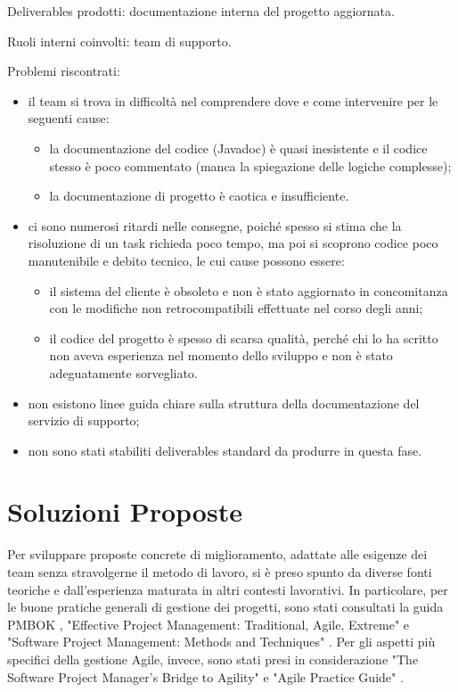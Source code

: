     Deliverables prodotti: documentazione interna del progetto aggiornata.

    Ruoli interni coinvolti: team di supporto.

    Problemi riscontrati:
    \begin{itemize}
        \item il team si trova in difficoltà nel comprendere dove e come intervenire per le seguenti cause:
            \begin{itemize}
                \item la documentazione del codice (Javadoc) è quasi inesistente e il codice stesso è poco commentato (manca la spiegazione delle logiche complesse);
                \item la documentazione di progetto è caotica e insufficiente.
            \end{itemize}
        \item ci sono numerosi ritardi nelle consegne, poiché spesso si stima che la risoluzione di un task richieda poco tempo,
        ma poi si scoprono codice poco manutenibile e debito tecnico, le cui cause possono essere:
            \begin{itemize}
                \item il sistema del cliente è obsoleto e non è stato aggiornato in concomitanza con le modifiche non retrocompatibili effettuate nel corso degli anni;
                \item il codice del progetto è spesso di scarsa qualità, perché chi lo ha scritto non aveva esperienza nel momento dello sviluppo e non è stato adeguatamente sorvegliato.
            \end{itemize}
        \item non esistono linee guida chiare sulla struttura della documentazione del servizio di supporto;
        \item non sono stati stabiliti deliverables standard da produrre in questa fase.
    \end{itemize}

\section{Soluzioni Proposte}
Per sviluppare proposte concrete di miglioramento, adattate alle esigenze dei team senza stravolgerne il metodo di lavoro, si è preso
spunto da diverse fonti teoriche e dall’esperienza maturata in altri contesti lavorativi. In particolare, per le buone pratiche generali
di gestione dei progetti, sono stati consultati la guida \ac{PMBOK} \cite{project2021guide}, "Effective Project Management: Traditional, Agile, Extreme"
\cite{wysocki2011effective} e "Software Project Management: Methods and Techniques" \cite{Peters20241}. Per gli aspetti più specifici della
gestione Agile, invece, sono stati presi in considerazione "The Software Project Manager’s Bridge to Agility" \cite{sliger2008software} e
"Agile Practice Guide" \cite{project2017agile}.

